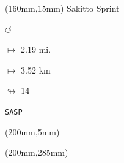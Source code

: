 \begin{textblock*}{40mm}(160mm,15mm)%
Sakitto Sprint
\par \Huge$\circlearrowleft$
\Large
\par$\mapsto$ 2.19 mi.
\par$\mapsto$ 3.52 km
\par$\looparrowright$ 14
\par\hfill\tiny\tt SASP\\
\end{textblock*}
\begin{textblock*}{20mm}(200mm,5mm)%
\fbox{\thepage}
\end{textblock*}
\begin{textblock*}{20mm}(200mm,285mm)%
\fbox{\thepage}
\end{textblock*}
\null\newpage

